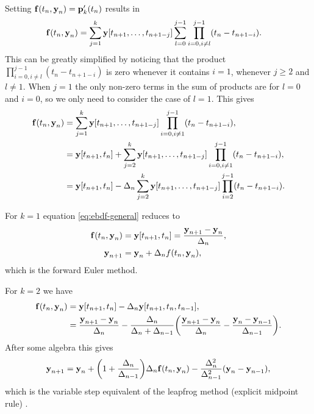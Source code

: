 Setting ${\boldsymbol{\mathrm{f}}{\left( t_n, \boldsymbol{\mathrm{y}}_n \right)}} = {\boldsymbol{\mathrm{p}}}_k'(t_n)$ results in
\begin{equation}
  \begin{aligned}
    {\boldsymbol{\mathrm{f}}{\left( t_n, \boldsymbol{\mathrm{y}}_n \right)}} &= \sum_{j=1}^k \boldsymbol{\mathrm{y}}[t_{n+1}, \ldots, t_{n+1-j}] \sum_{l=0}^{j-1} \prod_{i=0, i \neq l}^{j-1} (t_n - t_{n+1-i}).
  \end{aligned}
\end{equation}
This can be greatly simplified by noticing that the product $ \prod_{i=0, i \neq l}^{j-1} (t_n - t_{n+1-i})$ is zero whenever it contains $i=1$, \ie whenever $j \geq 2$ and $l \neq 1$.
When $j=1$ the only non-zero terms in the sum of products are for $l=0$ and $i=0$, so we only need to consider the case of $l=1$.
This gives
\begin{equation}
  \begin{aligned}
    {\boldsymbol{\mathrm{f}}{\left( t_n, \boldsymbol{\mathrm{y}}_n \right)}} &= \sum_{j=1}^k \boldsymbol{\mathrm{y}}[t_{n+1}, \ldots, t_{n+1-j}] \prod_{i=0, i \neq 1}^{j-1} (t_n - t_{n+1-i}), \\
    &= \boldsymbol{\mathrm{y}}[t_{n+1}, t_n] + \sum_{j=2}^k \boldsymbol{\mathrm{y}}[t_{n+1}, \ldots, t_{n+1-j}] \prod_{i=0, i \neq 1}^{j-1} (t_n - t_{n+1-i}), \\
    &= \boldsymbol{\mathrm{y}}[t_{n+1}, t_n] -\Delta_{n} \sum_{j=2}^k \boldsymbol{\mathrm{y}}[t_{n+1}, \ldots, t_{n+1-j}] \prod_{i=2}^{j-1} (t_n - t_{n+1-i}). \\
  \end{aligned}
  \label{eq:ebdf-general}
\end{equation}

For $k=1$ equation \cref{eq:ebdf-general} reduces to
\begin{equation}
  \begin{aligned}
    {\boldsymbol{\mathrm{f}}}(t_n, \boldsymbol{\mathrm{y}}_n) &= \boldsymbol{\mathrm{y}}[t_{n+1}, t_n] = \frac{\boldsymbol{\mathrm{y}}_{n+1} - \boldsymbol{\mathrm{y}}_n}{\Delta_{n}}, \\
    \boldsymbol{\mathrm{y}}_{n+1} &= \boldsymbol{\mathrm{y}}_n + \Delta_{n} f(t_n, \boldsymbol{\mathrm{y}}_n), \\
  \end{aligned}
\end{equation}
which is the forward Euler method.

For $k=2$ we have
\begin{equation}
  \begin{aligned}
    {\boldsymbol{\mathrm{f}}}(t_n, \boldsymbol{\mathrm{y}}_n) &= \boldsymbol{\mathrm{y}}[t_{n+1}, t_n] - \Delta_{n} \boldsymbol{\mathrm{y}}[t_{n+1}, t_n, t_{n-1}] , \\
    &=  \frac{\boldsymbol{\mathrm{y}}_{n+1} - \boldsymbol{\mathrm{y}}_n}{\Delta_{n}}
    - \frac{\Delta_{n}}{\Delta_{n} + \Delta_{n-1}} {\left(  \frac{\boldsymbol{\mathrm{y}}_{n+1} - \boldsymbol{\mathrm{y}}_n}{\Delta_{n}} - \frac{\boldsymbol{\mathrm{y}}_n - \boldsymbol{\mathrm{y}}_{n-1}}{\Delta_{n-1}} \right)}.
  \end{aligned}
\end{equation}
After some algebra this gives
\begin{equation}
  \label{eq:emr-derivation-rearranged}
  \boldsymbol{\mathrm{y}}_{n+1} = \boldsymbol{\mathrm{y}}_n + {\left( 1 + \frac{\Delta_{n}}{\Delta_{n-1}} \right)}\Delta_{n} {\boldsymbol{\mathrm{f}}{\left( t_n, \boldsymbol{\mathrm{y}}_n \right)}}
    - \frac{\Delta_{n}^2}{\Delta_{n-1}^2}(\boldsymbol{\mathrm{y}}_n - \boldsymbol{\mathrm{y}}_{n-1}),
\end{equation}
which is the variable step equivalent of the leapfrog method (explicit midpoint rule) \cite[715]{GreshoSani}.

